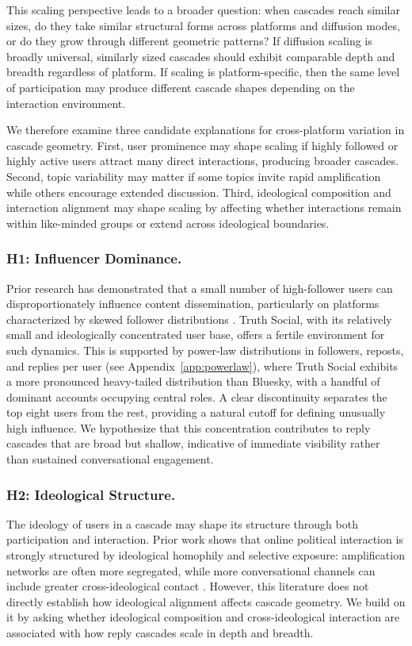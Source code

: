 \documentclass[letterpaper]{article} %
\begin{document}
This scaling perspective leads to a broader question: when cascades reach similar sizes, do they take similar structural forms across platforms and diffusion modes, or do they grow through different geometric patterns? If diffusion scaling is broadly universal, similarly sized cascades should exhibit comparable depth and breadth regardless of platform. If scaling is platform-specific, then the same level of participation may produce different cascade shapes depending on the interaction environment.

We therefore examine three candidate explanations for cross-platform variation in cascade geometry. First, user prominence may shape scaling if highly followed or highly active users attract many direct interactions, producing broader cascades. Second, topic variability may matter if some topics invite rapid amplification while others encourage extended discussion. Third, ideological composition and interaction alignment may shape scaling by affecting whether interactions remain within like-minded groups or extend across ideological boundaries. 

\subsubsection{H1: Influencer Dominance.}
Prior research has demonstrated that a small number of high-follower users can disproportionately influence content dissemination, particularly on platforms characterized by skewed follower distributions \cite{goel_structural_2016, zannettou_what_2018}. Truth Social, with its relatively small and ideologically concentrated user base, offers a fertile environment for such dynamics. This is supported by power-law distributions in followers, reposts, and replies per user (see Appendix~\ref{app:powerlaw}), where Truth Social exhibits a more pronounced heavy-tailed distribution than Bluesky, with a handful of dominant accounts occupying central roles. A clear discontinuity separates the top eight users from the rest, providing a natural cutoff for defining unusually high influence. We hypothesize that this concentration contributes to reply cascades that are broad but shallow, indicative of immediate visibility rather than sustained conversational engagement.

\subsubsection{H2: Ideological Structure.}

The ideology of users in a cascade may shape its structure through both participation and interaction. Prior work shows that online political interaction is strongly structured by ideological homophily and selective exposure: amplification networks are often more segregated, while more conversational channels can include greater cross-ideological contact \cite{conover_political_2011, garimella_political_2018, barbera_tweeting_2015, adamic_political_2005, guess_how_2023}. However, this literature does not directly establish how ideological alignment affects cascade geometry. We build on it by asking whether ideological composition and cross-ideological interaction are associated with how reply cascades scale in depth and breadth.
\end{document}
